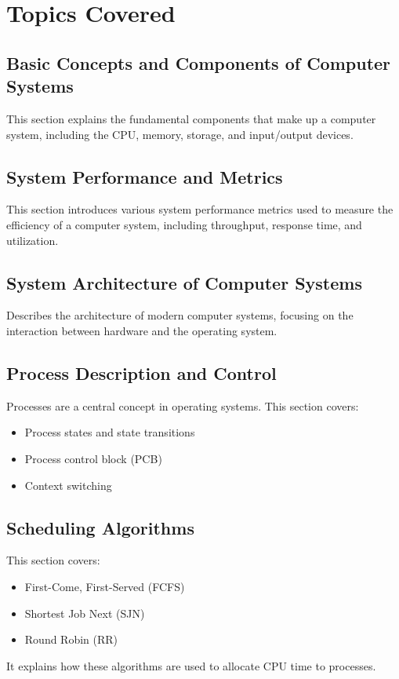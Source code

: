 \documentclass[12pt]{article}
\begin{document}
\section{Topics Covered}

\subsection{Basic Concepts and Components of Computer Systems}
This section explains the fundamental components that make up a computer
system, including the CPU, memory, storage, and input/output devices.

\subsection{System Performance and Metrics}
This section introduces various system performance metrics used to measure the
efficiency of a computer system, including throughput, response time, and
utilization.

\subsection{System Architecture of Computer Systems}
Describes the architecture of modern computer systems, focusing on the
interaction between hardware and the operating system.

\subsection{Process Description and Control}
Processes are a central concept in operating systems. This section covers:
\begin{itemize}
    \item Process states and state transitions
    \item Process control block (PCB)
    \item Context switching
\end{itemize}

\subsection{Scheduling Algorithms}
This section covers:
\begin{itemize}
    \item First-Come, First-Served (FCFS)
    \item Shortest Job Next (SJN)
    \item Round Robin (RR)
\end{itemize}
It explains how these algorithms are used to allocate CPU time to processes.
\end{document}
